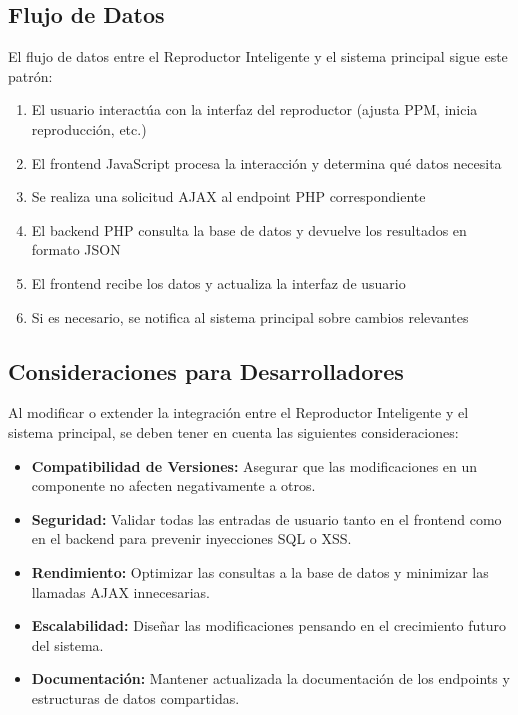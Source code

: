 \documentclass[a4paper,12pt]{article}
\begin{document}
\subsection{Flujo de Datos}
El flujo de datos entre el Reproductor Inteligente y el sistema principal sigue este patrón:

\begin{enumerate}
    \item El usuario interactúa con la interfaz del reproductor (ajusta PPM, inicia reproducción, etc.)
    \item El frontend JavaScript procesa la interacción y determina qué datos necesita
    \item Se realiza una solicitud AJAX al endpoint PHP correspondiente
    \item El backend PHP consulta la base de datos y devuelve los resultados en formato JSON
    \item El frontend recibe los datos y actualiza la interfaz de usuario
    \item Si es necesario, se notifica al sistema principal sobre cambios relevantes
\end{enumerate}

\subsection{Consideraciones para Desarrolladores}
Al modificar o extender la integración entre el Reproductor Inteligente y el sistema principal, se deben tener en cuenta las siguientes consideraciones:

\begin{itemize}
    \item \textbf{Compatibilidad de Versiones:} Asegurar que las modificaciones en un componente no afecten negativamente a otros.
    
    \item \textbf{Seguridad:} Validar todas las entradas de usuario tanto en el frontend como en el backend para prevenir inyecciones SQL o XSS.
    
    \item \textbf{Rendimiento:} Optimizar las consultas a la base de datos y minimizar las llamadas AJAX innecesarias.
    
    \item \textbf{Escalabilidad:} Diseñar las modificaciones pensando en el crecimiento futuro del sistema.
    
    \item \textbf{Documentación:} Mantener actualizada la documentación de los endpoints y estructuras de datos compartidas.
\end{itemize}
\end{document}

